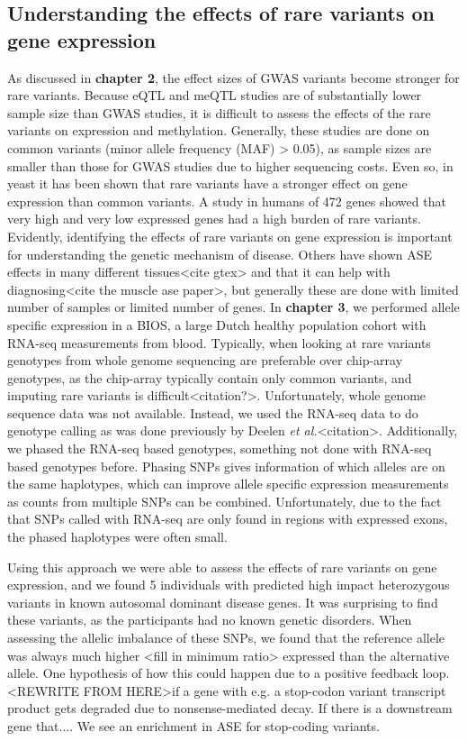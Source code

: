 \subsection{Understanding the effects of rare variants on gene expression}
As discussed in \textbf{chapter 2}, the effect sizes of GWAS variants become stronger for rare variants. Because eQTL and meQTL studies are of substantially lower sample size than GWAS studies, it is difficult to assess the effects of the rare variants on expression and methylation. Generally, these studies are done on common variants (minor allele frequency (MAF) > 0.05), as sample sizes are smaller than those for GWAS studies due to higher sequencing costs. Even so, in yeast it has been shown that rare variants have a stronger effect on gene expression than common variants\cite{bloomRareVariantsContribute2019}. A study in humans of 472 genes showed that very high and very low expressed genes had a high burden of rare variants\cite{zhaoBurdenRareVariants2016}. Evidently, identifying the effects of rare variants on gene expression is important for understanding the genetic mechanism of disease. Others have shown ASE effects in many different tissues<cite gtex> and that it can help with diagnosing<cite the muscle ase paper>, but generally these are done with limited number of samples or limited number of genes. In \textbf{chapter 3}, we performed allele specific expression in a BIOS, a large Dutch healthy population cohort with RNA-seq measurements from blood. Typically, when looking at rare variants genotypes from whole genome sequencing are preferable over chip-array genotypes, as the chip-array typically contain only common variants, and imputing rare variants is difficult<citation?>. Unfortunately, whole genome sequence data was not available. Instead, we used the RNA-seq data to do genotype calling as was done previously by Deelen \emph{et al.}<citation>. Additionally, we phased the RNA-seq based genotypes, something not done with RNA-seq based genotypes before. Phasing SNPs gives information of which alleles are on the same haplotypes, which can improve allele specific expression measurements as counts from multiple SNPs can be combined. Unfortunately, due to the fact that SNPs called with RNA-seq are only found in regions with expressed exons, the phased haplotypes were often small. 

Using this approach we were able to assess the effects of rare variants on gene expression, and we found 5 individuals with predicted high impact heterozygous variants in known autosomal dominant disease genes. It was surprising to find these variants, as the participants had no known genetic disorders. When assessing the allelic imbalance of these SNPs, we found that the reference allele was always much higher <fill in minimum ratio> expressed than the alternative allele. One hypothesis of how this could happen due to a positive feedback loop. <REWRITE FROM HERE>if a gene with e.g. a stop-codon variant transcript product gets degraded due to nonsense-mediated decay. If there is a downstream gene that.... We see an enrichment in ASE for stop-coding variants.

